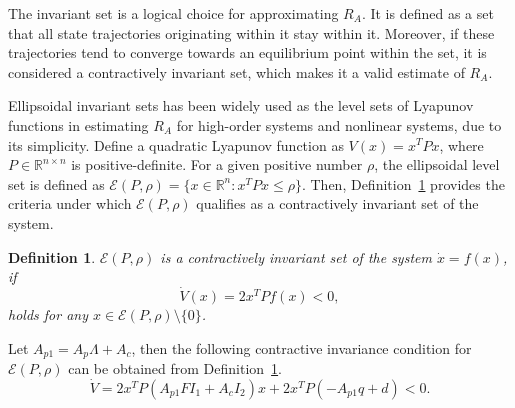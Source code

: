 \documentclass[10pt,final,journal,twoside]{IEEEtran}
\newtheorem{definition}{Definition}
\begin{document}
The invariant set is a logical choice for approximating $R_A$. It is defined as a set that all state trajectories originating within it stay within it. Moreover, if these trajectories
tend to converge towards an equilibrium point within the set, it is considered a contractively invariant set, which makes it a valid estimate of $R_A$.

Ellipsoidal invariant sets has been widely used as the level sets of Lyapunov functions in estimating $R_A$ for high-order systems and nonlinear systems, due to its simplicity\cite{silva2005,bookofhu,hu2002}. Define a quadratic Lyapunov
function as $V(x)=x^TPx$, where $P\in\mathbb{R}^{n\times n}$ is positive-definite. For a given positive number $\rho$, the ellipsoidal level set is defined as $\mathcal{E}(P,\rho)=\{x\in\mathbb{R}^n:x^TPx\leqslant\rho\}$.
Then, Definition~\ref{condcis} provides the criteria under which $\mathcal{E}(P,\rho)$ qualifies as a contractively invariant set of the system.
\begin{definition}\label{condcis}
$\mathcal{E}(P,\rho)$ is a contractively invariant set of the system $\dot{x}=f(x)$, if
\[\dot{V}(x)=2x^TPf(x)<0,\]
holds for any $x\in\mathcal{E}(P,\rho)\setminus\{0\}$.
\end{definition}

Let $A_{p1}=A_p\Lambda+A_c$, then the following contractive invariance condition for $\mathcal{E}(P,\rho)$ can be obtained from Definition~\ref{condcis}.
\begin{equation}\label{lyapf}
\dot{V}=2x^TP\left(A_{p1}FI_1+A_cI_2\right)x+2x^TP\left(-A_{p1}q+d\right)<0.
\end{equation}
\end{document}
